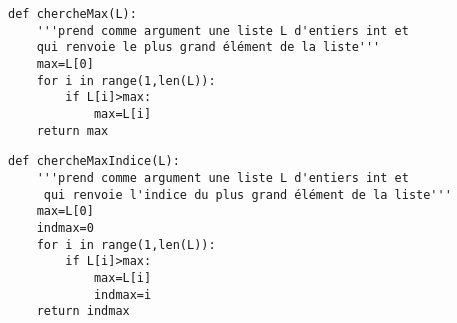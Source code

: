 
\begin{lstlisting}
def chercheMax(L):
    '''prend comme argument une liste L d'entiers int et 
    qui renvoie le plus grand élément de la liste'''
    max=L[0]
    for i in range(1,len(L)):
        if L[i]>max:
            max=L[i]
    return max
\end{lstlisting}



\begin{lstlisting}
def chercheMaxIndice(L):
    '''prend comme argument une liste L d'entiers int et
     qui renvoie l'indice du plus grand élément de la liste'''
    max=L[0]
    indmax=0
    for i in range(1,len(L)):
        if L[i]>max:
            max=L[i]
            indmax=i
    return indmax
\end{lstlisting}
